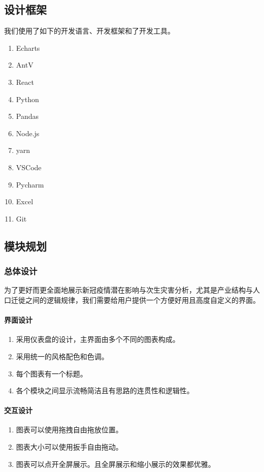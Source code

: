 \documentclass{ctexart}
\begin{document}
\subsection{设计框架}
我们使用了如下的开发语言、开发框架和了开发工具。
\begin{enumerate}
    \item Echarts
    \item AntV
    \item React
    \item Python
    \item Pandas
    \item Node.js
    \item yarn
    \item VSCode
    \item Pycharm
    \item Excel
    \item Git
\end{enumerate}
\subsection{模块规划}
\subsubsection{总体设计}
为了更好而更全面地展示新冠疫情潜在影响与次生灾害分析，尤其是产业结构与人口迁徙之间的逻辑规律，我们需要给用户提供一个方便好用且高度自定义的界面。
\paragraph{界面设计}
\begin{enumerate}
    \item 采用仪表盘的设计，主界面由多个不同的图表构成。
    \item 采用统一的风格配色和色调。
    \item 每个图表有一个标题。
    \item 各个模块之间显示流畅简洁且有思路的连贯性和逻辑性。
\end{enumerate}

\paragraph{交互设计}
\begin{enumerate}
    \item 图表可以使用拖拽自由拖放位置。
    \item 图表大小可以使用扳手自由拖动。
    \item 图表可以点开全屏展示。且全屏展示和缩小展示的效果都优雅。
\end{enumerate}
\end{document}
